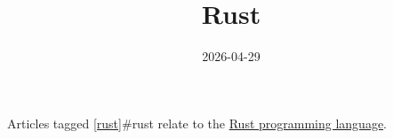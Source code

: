 \documentclass{note}
\title{Rust}
\date{2026-04-29}
\begin{document}
Articles tagged \ref{rust}{#rust} relate to the \href{https://rust-lang.org/}{Rust programming language}.
\end{document}
